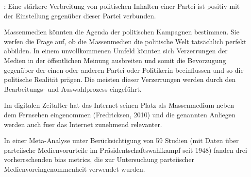 \documentclass[12pt,a4paper,notitlepage]{article}
\begin{document}
\citet{benewick_floating_1969}: Eine stärkere Verbreitung von politischen Inhalten einer Partei ist positiv mit der Einstellung gegenüber dieser Partei verbunden. 

\citet{mccombs_agenda-setting_1972} Massenmedien könnten die Agenda der politischen Kampagnen bestimmen. Sie werfen die Frage auf, ob die Massenmedien die politische Welt tatsächlich perfekt abbilden. In einem unvollkommenen Umfeld könnten sich Verzerrungen der Medien in der öffentlichen Meinung ausbreiten und somit die Bevorzugung gegenüber der einen oder anderen Partei oder Politikerin beeinflussen und so die politische Realität prägen. Die meisten dieser Verzerrungen werden durch den Bearbeitungs- und Auswahlprozess eingeführt. 

Im digitalen Zeitalter hat das Internet seinen Platz als Massenmedium neben dem Fernsehen eingenommen (Fredricksen, 2010) und die genannten Anliegen werden auch fuer das Internet zunehmend relevanter.

In einer Meta-Analyse unter Berücksichtigung von 59 Studien (mit Daten über parteiische Medienvorurteile im Präsidentschaftswahlkampf seit 1948) fanden \citet{dalessio_media_2000} drei vorherrschenden bias metrics, die zur Untersuchung parteiischer Medienvoreingenommenheit verwendet wurden.
\end{document}
